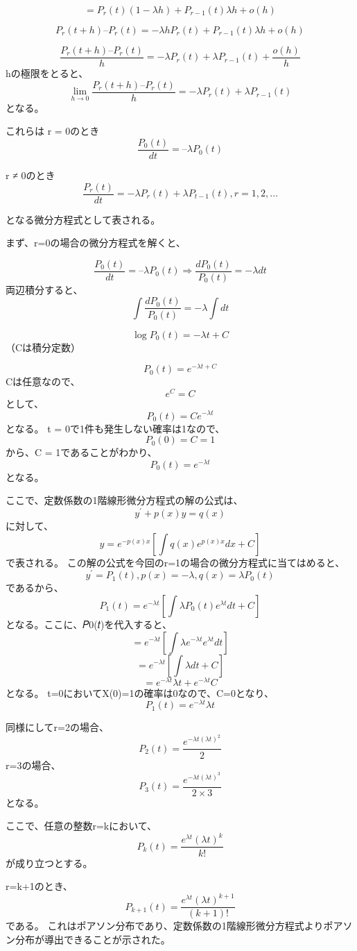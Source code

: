 \documentclass[]{article}
\begin{document}
\[= P_r(t)(1-\lambda h) + P_{r-1}(t)\lambda h + o(h) \]

\[P_r(t+h) – P_r(t) = -\lambda h P_r(t) + P_{r-1}(t)\lambda h + o(h) \]

\[\frac{P_r(t+h) – P_r(t)}{h} = -\lambda P_r(t) + \lambda P_{r-1}(t) + \frac{o(h)}{h} \]
hの極限をとると、
\[\lim_{h\to 0} \frac{P_r(t+h) – P_r(t)}{h} = -\lambda P_r(t) + \lambda P_{r-1}(t) \]
となる。

これらは r = 0のとき \[\frac{P_0(t)}{dt} = – \lambda P_0(t)\]

r ≠ 0のとき
\[\frac{P_r(t)}{dt} = -\lambda P_r(t) + \lambda P_{t-1}(t), r = 1,2,\dots\]

となる微分方程式として表される。

まず、r=0の場合の微分方程式を解くと、

\[\frac{P_0(t)}{dt} = – \lambda P_0(t) \Rightarrow \frac{d P_0(t)}{P_0(t)} = -\lambda dt \]
両辺積分すると、 \[ \int \frac{d P_0(t)}{P_0(t)} = -\lambda \int dt \]

\[ \log P_0(t) = -\lambda t + C\] （Cは積分定数）

\[P_0(t) = e^{-\lambda t +C}\] Cは任意なので、 \[e^C=C\] として、
\[P_0(t) = Ce^{-\lambda t}\] となる。 t =
0で1件も発生しない確率は1なので、 \[P_0(0)=C=1\] から、C =
1であることがわかり、 \[P_0(t) = e^{-\lambda t}\] となる。

ここで、定数係数の1階線形微分方程式の解の公式は、
\[y^{\prime} + p(x)y = q(x)\] に対して、
\[y = e^{-p(x)x}\left[ \int q(x) e^{p(x)x}dx + C \right]\] で表される。
この解の公式を今回のr=1の場合の微分方程式に当てはめると、
\[y^{\prime} = P_1(t) , p(x) = -\lambda , q(x) = \lambda P_0(t) \]
であるから、
\[P_1(t) = e^{-\lambda t}\left[ \int \lambda P_0(t) e^{\lambda t} dt + C \right] \]
となる。ここに、𝑃0(𝑡)を代入すると、
\[ = e^{-\lambda t}\left[ \int \lambda e^{-\lambda t} e^{\lambda t} dt \right] \]
\[ = e^{-\lambda t}\left[ \int \lambda dt + C \right] \]
\[ = e^{-\lambda t} \lambda t + e^{-\lambda t}C \] となる。
t=0においてX(0)=1の確率は0なので、C=0となり、
\[P_1(t) = e^{-\lambda t} \lambda t \]

同様にしてr=2の場合、
\[P_2(t) = \frac{e^{-\lambda t \left( \lambda t \right)^2}}{2} \]
r=3の場合、
\[P_3(t) = \frac{e^{-\lambda t \left( \lambda t \right)^3}}{2 \times 3} \]
となる。

ここで、任意の整数r=kにおいて、
\[P_k(t) = \frac{e^{\lambda t} \left( \lambda t \right)^k }{k!}\]
が成り立つとする。

r=k+1のとき、
\[P_{k+1}(t) = \frac{e^{\lambda t} \left( \lambda t \right)^{k+1} }{(k+1)!}\]
である。
これはポアソン分布であり、定数係数の1階線形微分方程式よりポアソン分布が導出できることが示された。
\end{document}
